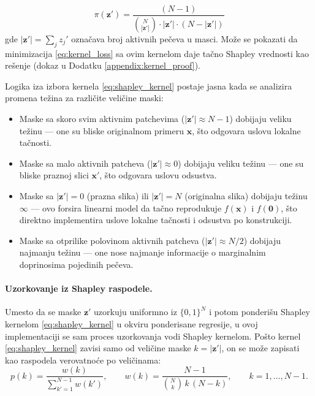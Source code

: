 \begin{equation}
    \pi(\mathbf{z}') = \frac{(N-1)}{\binom{N}{|\mathbf{z}'|} \cdot 
    |\mathbf{z}'| \cdot (N - |\mathbf{z}'|)}
    \label{eq:shapley_kernel}
\end{equation}
gde $|\mathbf{z}'| = \sum_j z_j'$ označava broj aktivnih pečeva u masci. 
Može se pokazati da minimizacija \eqref{eq:kernel_loss} sa ovim kernelom 
daje tačno Shapley vrednosti kao rešenje (dokaz u Dodatku 
\ref{appendix:kernel_proof}).

Logika iza izbora kernela \eqref{eq:shapley_kernel} postaje jasna kada se analizira promena težina za različite veličine maski:

\begin{itemize}
    \item Maske sa skoro svim aktivnim patchevima ($|\mathbf{z}'| \approx N-1$) 
    dobijaju veliku težinu — one su bliske originalnom primeru $\mathbf{x}$, 
    što odgovara uslovu lokalne tačnosti.
    
    \item Maske sa malo aktivnih patcheva ($|\mathbf{z}'| \approx 0$) 
    dobijaju veliku težinu — one su bliske praznoj slici $\mathbf{x}'$, 
    što odgovara uslovu odsustva.
    
    \item Maske sa $|\mathbf{z}'| = 0$ (prazna slika) ili $|\mathbf{z}'| = N$ 
    (originalna slika) dobijaju težinu $\infty$ — ovo forsira linearni model 
    da tačno reprodukuje $f(\mathbf{x})$ i $f(\mathbf{0})$, što direktno 
    implementira uslove lokalne tačnosti i odsustva po konstrukciji.
    
    \item Maske sa otprilike polovinom aktivnih patcheva 
    ($|\mathbf{z}'| \approx N/2$) dobijaju najmanju težinu — one nose 
    najmanje informacije o marginalnim doprinosima pojedinih pečeva.
\end{itemize}

\paragraph{Uzorkovanje iz Shapley raspodele.}
Umesto da se maske $\mathbf{z}'$ uzorkuju uniformno iz $\{0,1\}^N$ i potom
ponderišu Shapley kernelom \eqref{eq:shapley_kernel} u okviru ponderisane
regresije, u ovoj implementaciji se sam proces uzorkovanja vodi Shapley
kernelom. Pošto kernel \eqref{eq:shapley_kernel} zavisi samo od veličine
maske $k = |\mathbf{z}'|$, on se može zapisati kao raspodela verovatnoće
po veličinama:
\begin{equation}
    p(k) = \frac{w(k)}{\sum_{k'=1}^{N-1} w(k')}, \qquad
    w(k) = \frac{N-1}{\binom{N}{k}\, k\, (N-k)}, \qquad k = 1, \ldots, N-1.
    \label{eq:size_dist}
\end{equation}

